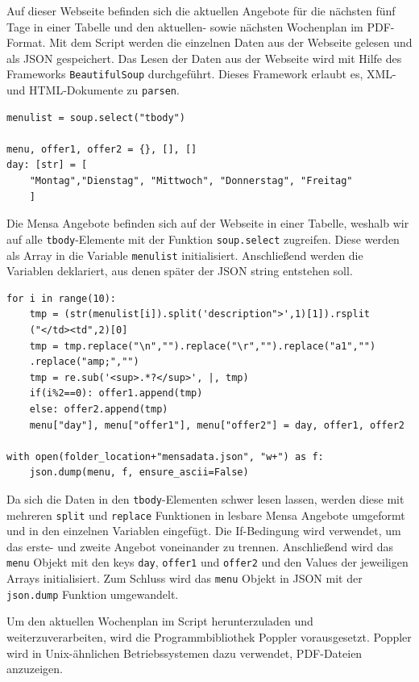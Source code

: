 Auf dieser Webseite befinden sich die aktuellen Angebote für die nächsten fünf Tage in einer Tabelle und den aktuellen- sowie nächsten Wochenplan im PDF-Format. Mit dem Script werden die einzelnen Daten aus der Webseite gelesen und als JSON gespeichert. Das Lesen der Daten aus der Webseite wird mit Hilfe des Frameworks \verb|BeautifulSoup| durchgeführt. Dieses Framework erlaubt es, XML- und HTML-Dokumente zu \verb|parsen|.\\

\begin{lstlisting}
menulist = soup.select("tbody")

menu, offer1, offer2 = {}, [], []
day: [str] = [
    "Montag","Dienstag", "Mittwoch", "Donnerstag", "Freitag"
    ]
\end{lstlisting}

Die Mensa Angebote befinden sich auf der Webseite in einer Tabelle, weshalb wir auf alle \verb|tbody|-Elemente mit der Funktion \verb|soup.select| zugreifen. Diese werden als Array in die Variable \verb|menulist| initialisiert. Anschließend werden die Variablen deklariert, aus denen später der JSON string entstehen soll. \\

\begin{lstlisting}
for i in range(10):
    tmp = (str(menulist[i]).split('description">',1)[1]).rsplit
    ("</td><td",2)[0]
    tmp = tmp.replace("\n","").replace("\r","").replace("a1","")
    .replace("amp;","")
    tmp = re.sub('<sup>.*?</sup>', |, tmp)
    if(i%2==0): offer1.append(tmp)
    else: offer2.append(tmp)
    menu["day"], menu["offer1"], menu["offer2"] = day, offer1, offer2

with open(folder_location+"mensadata.json", "w+") as f:
    json.dump(menu, f, ensure_ascii=False)
\end{lstlisting}

Da sich die Daten in den \verb|tbody|-Elementen schwer lesen lassen, werden diese mit mehreren \verb|split| und \verb|replace| Funktionen in lesbare Mensa Angebote umgeformt und in den einzelnen Variablen eingefügt. Die If-Bedingung wird verwendet, um das erste- und zweite Angebot voneinander zu trennen. Anschließend wird das \verb|menu| Objekt mit den keys \verb|day|, \verb|offer1| und \verb|offer2| und den Values der jeweiligen Arrays initialisiert.
Zum Schluss wird das \verb|menu| Objekt in JSON mit der \verb|json.dump| Funktion umgewandelt.

Um den aktuellen Wochenplan im Script herunterzuladen und weiterzuverarbeiten, wird die Programmbibliothek Poppler vorausgesetzt. Poppler wird in Unix-ähnlichen Betriebssystemen dazu verwendet, PDF-Dateien anzuzeigen.\\

